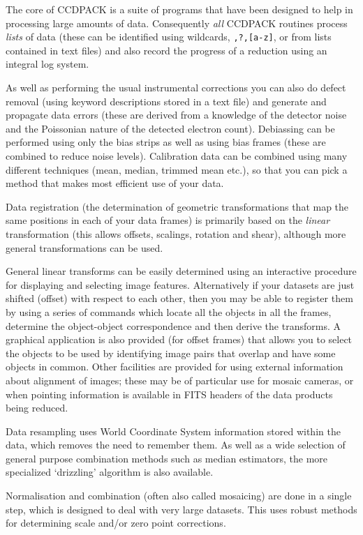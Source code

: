 \documentclass[twoside,11pt]{article}
\renewcommand{\_}{\texttt{\symbol{95}}}
\newcommand{\text}[1]{{\small \tt #1}}
\begin{document}
The core of CCDPACK is a suite of programs that have been designed to
help in processing large amounts of data.  Consequently {\em all}
CCDPACK routines process {\em lists} of data (these can be identified
using wildcards, \text{*,?,[a-z]}, or from lists contained in
text files) and also record the progress of a reduction using an
integral log system.

As well as performing the usual instrumental corrections you can
also do defect removal (using keyword descriptions stored in a text file)
and generate and propagate data errors (these are derived from a knowledge
of the detector noise and the Poissonian nature of the detected
electron count).
Debiassing can be performed using only the bias strips as well as
using bias frames (these are combined to reduce noise levels).
Calibration data can be combined using many different techniques
(mean, median, trimmed mean etc.), so that you can pick a method that
makes most efficient use of your data.

Data registration (the determination of geometric transformations that
map the same positions in each of your data frames) is primarily based
on the {\em linear} transformation (this allows offsets, scalings,
rotation and shear), although more general transformations can be
used.

General linear transforms can be easily determined using an
interactive procedure for displaying and selecting image features.
Alternatively if your datasets are just shifted (offset) with respect
to each other, then you may be able to register them by using a series
of commands which locate all the objects in all the frames,
determine the object-object correspondence and then derive the
transforms.
A graphical application is also provided (for offset frames) that allows
you to select the objects to be used by identifying image pairs that
overlap and have some objects in common.
Other facilities are provided for using external information about
alignment of images; these may be of particular use for mosaic
cameras, or when pointing information is available in FITS headers
of the data products being reduced.

Data resampling uses World Coordinate System information stored 
within the data, which removes the need to remember them. 
As well as a wide selection of general purpose combination methods 
such as median estimators, the more specialized `drizzling' 
algorithm is also available.

Normalisation and combination (often also called mosaicing) 
are done in a single step, which is
designed to deal with very large datasets.
This uses robust methods for determining scale and/or zero point
corrections.
\end{document}
